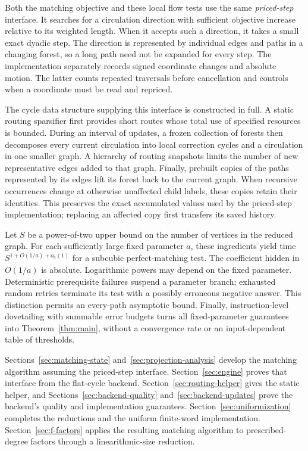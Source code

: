 Both the matching objective and these local flow tests use the same
\emph{priced-step} interface.  It searches for a circulation direction
with sufficient objective increase relative to its weighted length.
When it accepts such a direction, it takes a small exact dyadic step.  The direction is represented by
individual edges and paths in a changing forest, so a long path need not
be expanded for every step.  The implementation separately records
signed coordinate changes and absolute motion.  The latter counts
repeated traversals before cancellation and controls when a coordinate
must be read and repriced.

The cycle data structure supplying this interface is constructed in
full.  A static routing sparsifier first provides short routes whose
total use of specified resources is bounded.  During an interval of
updates, a frozen collection of forests then decomposes every current
circulation into local correction cycles and a circulation in one
smaller graph.  A hierarchy of routing snapshots limits the number of
new representative edges added to that graph.  Finally, prebuilt copies
of the paths represented by its edges lift its forest back to the
current graph.  When recursive occurrences change at otherwise unaffected
child labels, these copies retain their identities. This preserves the exact
accumulated values used by the priced-step implementation; replacing an affected copy first transfers its saved history.

Let $S$ be a power-of-two upper bound on the number of vertices in the
reduced graph. For each sufficiently large fixed parameter $a$, these
ingredients yield time $S^{1+O(1/a)+o_a(1)}$ for a subcubic
perfect-matching test. The coefficient
hidden in $O(1/a)$ is absolute. Logarithmic powers may depend on the fixed
parameter. Deterministic prerequisite failures suspend a parameter branch;
exhausted random retries terminate its test with a possibly erroneous
negative answer. This distinction permits an every-path asymptotic bound.
Finally, instruction-level dovetailing with summable error budgets turns all
fixed-parameter guarantees into Theorem~\ref{thm:main}, without a convergence
rate or an input-dependent table of thresholds.

Sections~\ref{sec:matching-state} and~\ref{sec:projection-analysis} develop
the matching algorithm assuming the priced-step interface.
Section~\ref{sec:engine} proves that interface from the flat-cycle backend.
Section~\ref{sec:routing-helper} gives the static helper, and
Sections~\ref{sec:backend-quality} and~\ref{sec:backend-updates} prove
the backend's quality and implementation guarantees.
Section~\ref{sec:uniformization} completes the reductions and the uniform
finite-word implementation.
Section~\ref{sec:f-factors} applies the resulting matching algorithm to
prescribed-degree factors through a linearithmic-size reduction.

